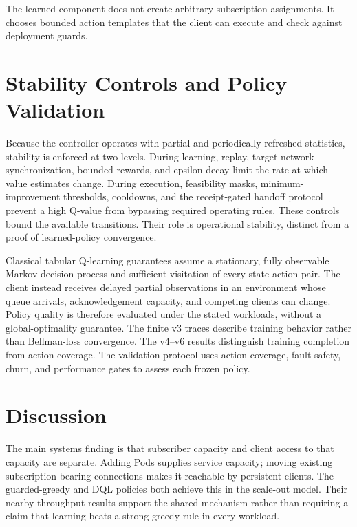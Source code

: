 \documentclass[manuscript,nonacm]{acmart}
\begin{document}
The learned component does not create arbitrary subscription assignments.
It chooses bounded action templates that the client can execute and check
against deployment guards.





\section{Stability Controls and Policy Validation}

Because the controller operates with partial and periodically refreshed
statistics, stability is enforced at two levels.  During learning, replay,
target-network synchronization, bounded rewards, and epsilon decay limit the
rate at which value estimates change.  During execution, feasibility masks,
minimum-improvement thresholds, cooldowns, and the receipt-gated handoff protocol
prevent a high Q-value from bypassing required operating rules. These controls
bound the available transitions. Their role is operational stability, distinct
from a proof of learned-policy convergence.

Classical tabular Q-learning guarantees assume a stationary, fully observable
Markov decision process and sufficient visitation of every state-action pair.
The client instead receives delayed partial observations in an environment
whose queue arrivals, acknowledgement capacity, and competing clients can
change. Policy quality is therefore evaluated under the stated workloads,
without a global-optimality guarantee. The finite v3 traces describe training
behavior rather than Bellman-loss convergence. The v4--v6 results distinguish
training completion from action coverage. The validation protocol uses
action-coverage, fault-safety, churn, and performance gates to assess each
frozen policy.

\section{Discussion}

The main systems finding is that subscriber capacity and client access to that
capacity are separate. Adding Pods supplies service capacity; moving existing
subscription-bearing connections makes it reachable by persistent clients.
The guarded-greedy and DQL policies both achieve this in the scale-out model.
Their nearby throughput results support the shared mechanism rather than
requiring a claim that learning beats a strong greedy rule in every workload.
\end{document}
